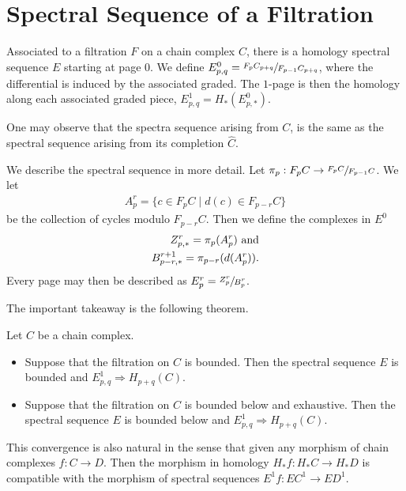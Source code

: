 \documentclass[../thesis.tex]{subfiles}
\begin{document}
    \section{Spectral Sequence of a Filtration}

        Associated to a filtration $F$ on a chain complex $C$, there is a homology spectral sequence $E$ starting at page $0$. We define $E^0_{p,q} = \sfrac{F_pC_{p+q}}{F_{p-1}C_{p+q}}$, where the differential is induced by the associated graded. The $1$-page is then the homology along each associated graded piece, $E^1_{p,q} = H_*(E_{p,*}^0)$.

        One may observe that the spectra sequence arising from $C$, is the same as the spectral sequence arising from its completion $\widehat{C}$.

        We describe the spectral sequence in more detail. Let $\pi_p : F_pC \rightarrow \sfrac{F_pC}{F_{p-1}C}$. We let
        \begin{align*}
            A^r_p = \{c \in F_pC \mid d(c) \in F_{p-r}C\}
        \end{align*}
        be the collection of cycles modulo $F_{p-r}C$. Then we define the complexes in $E^0$
        \begin{align*}
            Z^r_{p,*} = \pi_p(A^r_p)\tt{ and}\\
            B^{r+1}_{p-r,*} = \pi_{p-r}(d(A^r_p))\tt{.}
        \end{align*}
        Every page may then be described as $E^r_p = \sfrac{Z^r_p}{B^r_p}$.

        The important takeaway is the following theorem.
        \begin{thm}\label{thm: class-conv}
            Let $C$ be a chain complex.
            \begin{itemize}
                \item Suppose that the filtration on $C$ is bounded. Then the spectral sequence $E$ is bounded and $E^1_{p,q} \Rightarrow H_{p+q}(C)$.
                \item Suppose that the filtration on $C$ is bounded below and exhaustive. Then the spectral sequence $E$ is bounded below and $E^1_{p,q} \Rightarrow H_{p+q}(C)$.
            \end{itemize}
            This convergence is also natural in the sense that given any morphism of chain complexes $f : C \rightarrow D$. Then the morphism in homology $H_*f : H_*C \rightarrow H_*D$ is compatible with the morphism of spectral sequences $E^1f : EC^1 \rightarrow ED^1$.
        \end{thm}
\end{document}
